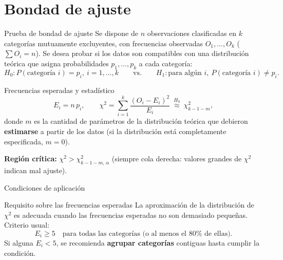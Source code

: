 \documentclass[aspectratio=169,11pt]{beamer}
\begin{document}
\section{Bondad de ajuste}

\begin{frame}{Prueba de bondad de ajuste}
Se dispone de $n$ observaciones clasificadas en $k$ categorías mutuamente excluyentes, con frecuencias observadas $O_1,\dots,O_k$ ($\sum O_i=n$). Se desea probar si los datos son compatibles con una distribución teórica que asigna probabilidades $p_1,\dots,p_k$ a cada categoría:
\[
H_0: P(\text{categoría } i) = p_i, \ i=1,\dots,k \qquad \text{vs.} \qquad H_1: \text{para algún } i,\ P(\text{categoría } i)\neq p_i.
\]

\begin{block}{Frecuencias esperadas y estadístico}
\[
E_i = n\,p_i, \qquad \chi^2 = \sum_{i=1}^{k}\frac{(O_i-E_i)^2}{E_i} \ \overset{H_0}{\approx}\ \chi^2_{k-1-m},
\]
donde $m$ es la cantidad de parámetros de la distribución teórica que debieron \textbf{estimarse} a partir de los datos (si la distribución está completamente especificada, $m=0$).
\end{block}

\textbf{Región crítica:} $\chi^2 > \chi^2_{k-1-m,\,\alpha}$ (siempre cola derecha: valores grandes de $\chi^2$ indican mal ajuste).
\end{frame}

\begin{frame}{Condiciones de aplicación}
\begin{alertblock}{Requisito sobre las frecuencias esperadas}
La aproximación de la distribución de $\chi^2$ es adecuada cuando las frecuencias esperadas no son demasiado pequeñas. Criterio usual:
\[
E_i \ge 5 \quad \text{para todas las categorías (o al menos el $80\%$ de ellas).}
\]
Si alguna $E_i<5$, se recomienda \textbf{agrupar categorías} contiguas hasta cumplir la condición.
\end{alertblock}
\end{frame}
\end{document}
